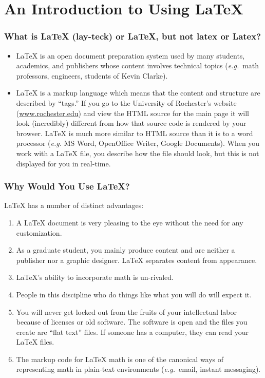\part{An Introduction to Using \LaTeX{}}
\section{What is \LaTeX{} (lay-teck) or LaTeX, but not latex or Latex?}

\begin{itemize}
  
\item \LaTeX{} is an open document preparation system used by many
  students, academics, and publishers whose content involves technical
  topics (\textit{e.g.}\ math professors, engineers, students of Kevin
  Clarke).
  
\item \LaTeX{} is a markup language which means that the content and
  structure are described by ``tags.'' If you go to the University of
  Rochester's website (\url{www.rochester.edu}) and view the HTML
  source for the main page it will look (incredibly) different from
  how that source code is rendered by your browser. \LaTeX{} is much
  more similar to HTML source than it is to a word processor
  (\textit{e.g.}  MS Word, OpenOffice Writer, Google Documents). When
  you work with a \LaTeX{} file, you describe how the file should
  look, but this is not displayed for you in real-time.
\end{itemize}
  
\section{Why Would You Use \LaTeX{}?}
\LaTeX{} has a number of distinct advantages:
\begin{enumerate}
\item A \LaTeX{} document is very pleasing to the eye without the need
  for any customization.
  
\item As a graduate student, you mainly produce content and are
  neither a publisher nor a graphic designer.  \LaTeX{} separates
  content from appearance.

\item \LaTeX{}'s ability to incorporate math is un-rivaled.

\item People in this discipline who do things like what you will do
  will expect it.

\item You will never get locked out from the fruits of your
  intellectual labor because of licenses or old software. The software
  is open and the files you create are ``flat text'' files. If someone
  has a computer, they can read your \LaTeX{} files.

\item The markup code for \LaTeX{} math is one of the canonical ways
  of representing math in plain-text environments (\textit{e.g.}\
  email, instant messaging).
\end{enumerate}

